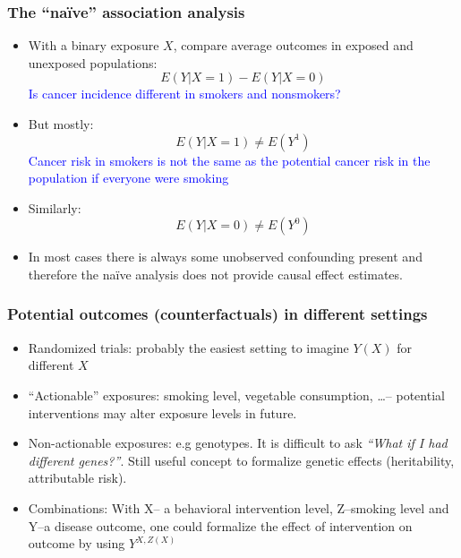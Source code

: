 \documentclass[10pt,dvipsnames,t,handout%
,aspectratio=169%
]{beamer}%
\begin{document}
\begin{frame}
	\frametitle{The ``na\"ive'' association analysis}
	{\small  \begin{itemize}
			\item With a binary exposure $X$, compare average outcomes in exposed and unexposed populations:
			\[E(Y|X=1) - E(Y|X=0)\]
			\textcolor{blue}{Is cancer incidence different in smokers and nonsmokers?}
			\item But mostly:
			\[E(Y|X=1) \ne E(Y^1)\]
			\textcolor{blue}{Cancer risk in smokers is not the same as the potential cancer risk in the population if everyone were smoking}
			\item Similarly:
			\[E(Y|X=0) \ne E(Y^0)\]
			\item In most cases there is always some \alert{unobserved confounding} present and therefore the
			na\"ive analysis does not provide causal effect estimates.  
	\end{itemize}}
\end{frame}



\begin{frame}
	\frametitle{Potential outcomes (counterfactuals) in different settings}
	\begin{itemize}
		\item \alert<1>{Randomized trials}: probably the easiest setting to imagine $Y(X)$ for different $X$
		\item \alert<2>{``Actionable'' exposures}: smoking level, vegetable consumption, \ldots -- potential interventions may alter exposure levels in future.
		\item \alert<3>{Non-actionable exposures}: e.g genotypes. It is difficult to ask \emph{``What if I had different genes?''}. Still useful concept to formalize genetic effects (heritability, attributable risk).
		\item \alert<4>{Combinations}: With X-- a behavioral intervention level, Z--smoking level and Y--a disease outcome, one could formalize the effect of intervention on outcome by using $Y^{X, Z(X)}$
	\end{itemize}
\end{frame}
\end{document}
